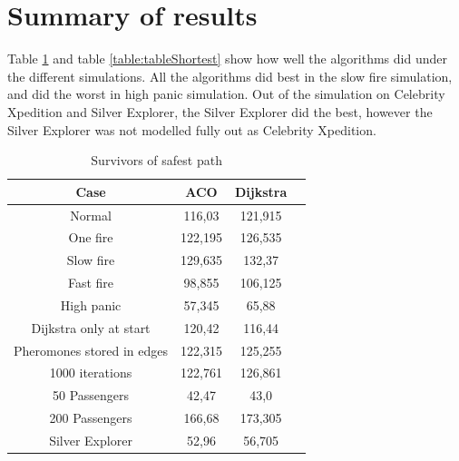 \section{Summary of results}

Table \ref{table:tableSafest} and table \ref{table:tableShortest} show how well the algorithms did under the different simulations. All the algorithms did best in the slow fire simulation, and did the worst in high panic simulation. Out of the simulation on Celebrity Xpedition and Silver Explorer, the Silver Explorer did the best, however the Silver Explorer was not modelled fully out as Celebrity Xpedition.

\begin{table}[ht]
\caption{Survivors of safest path} 				%
\centering										%
\begin{tabular}{c c c c}						%
\hline
\hline 											%
Case & ACO & Dijkstra \\[0.5ex]%
\hline											%
Normal & 116,03 & 121,915 \\							%
One fire & 122,195 & 126,535 \\
Slow fire & 129,635 & 132,37 \\
Fast fire & 98,855 & 106,125 \\
High panic & 57,345 & 65,88 \\
Dijkstra only at start & 120,42 & 116,44 \\
Pheromones stored in edges & 122,315 & 125,255 \\
1000 iterations & 122,761 & 126,861 \\
50 Passengers & 42,47 & 43,0 \\
200 Passengers & 166,68 & 173,305 \\ 
Silver Explorer & 52,96 & 56,705 \\ [1ex]						%
\hline														%

\end{tabular}
\label{table:tableSafest}								
\end{table}


